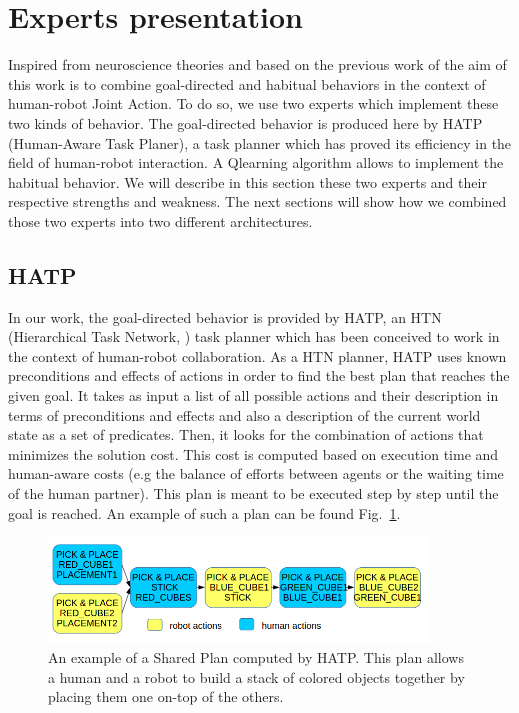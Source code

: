 \documentclass[english,a4paper,11pt,twoside]{StyleThese}
\begin{document}
\section{Experts presentation}

Inspired from neuroscience theories and based on the previous work of \cite{renaudo2014design} the aim of this work is to combine goal-directed and habitual behaviors in the context of human-robot Joint Action. To do so, we use two experts which implement these two kinds of behavior. The goal-directed behavior is produced here by HATP (Human-Aware Task Planer), a task planner which has proved its efficiency in the field of human-robot interaction. A Qlearning algorithm allows to implement the habitual behavior. We will describe in this section these two experts and their respective strengths and weakness. The next sections will show how we combined those two experts into two different architectures.

\subsection{HATP}

In our work, the goal-directed behavior is provided by HATP, an HTN (Hierarchical Task Network, \cite{erol1994htn}) task planner which has been conceived to work in the context of human-robot collaboration.  As a HTN planner, HATP uses known preconditions and effects of actions in order to find the best plan that reaches the given goal. It takes as input a list of all possible actions and their description in terms of preconditions and effects and also a description of the current world state as a set of predicates. Then, it looks for the combination of actions that minimizes the solution cost. This cost is computed based on execution time and human-aware costs (e.g the balance of efforts between agents or the waiting time of the human partner). This plan is meant to be executed step by step until the goal is reached. An example of such a plan can be found Fig.~\ref{fig:examplePlan}.

\begin{figure}[!h]
	\centering
    \includegraphics[width=0.9\textwidth]{figs/Chapter7/SharedPlan.png}
    \caption{An example of a Shared Plan computed by HATP. This plan allows a human and a robot to build a stack of colored objects together by placing them one on-top of the others.}
    \label{fig:examplePlan}
\end{figure}
\end{document}
